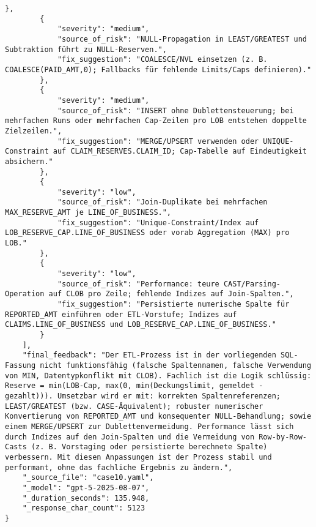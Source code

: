 \begin{lstlisting}[caption={Ausgabe: GPT-5 Anwendungsfall 10 Robustheitsdurchlauf},label={gpt_case10_prompt3}]
        },
        {
            "severity": "medium",
            "source_of_risk": "NULL-Propagation in LEAST/GREATEST und Subtraktion führt zu NULL-Reserven.",
            "fix_suggestion": "COALESCE/NVL einsetzen (z. B. COALESCE(PAID_AMT,0); Fallbacks für fehlende Limits/Caps definieren)."
        },
        {
            "severity": "medium",
            "source_of_risk": "INSERT ohne Dublettensteuerung; bei mehrfachen Runs oder mehrfachen Cap-Zeilen pro LOB entstehen doppelte Zielzeilen.",
            "fix_suggestion": "MERGE/UPSERT verwenden oder UNIQUE-Constraint auf CLAIM_RESERVES.CLAIM_ID; Cap-Tabelle auf Eindeutigkeit absichern."
        },
        {
            "severity": "low",
            "source_of_risk": "Join-Duplikate bei mehrfachen MAX_RESERVE_AMT je LINE_OF_BUSINESS.",
            "fix_suggestion": "Unique-Constraint/Index auf LOB_RESERVE_CAP.LINE_OF_BUSINESS oder vorab Aggregation (MAX) pro LOB."
        },
        {
            "severity": "low",
            "source_of_risk": "Performance: teure CAST/Parsing-Operation auf CLOB pro Zeile; fehlende Indizes auf Join-Spalten.",
            "fix_suggestion": "Persistierte numerische Spalte für REPORTED_AMT einführen oder ETL-Vorstufe; Indizes auf CLAIMS.LINE_OF_BUSINESS und LOB_RESERVE_CAP.LINE_OF_BUSINESS."
        }
    ],
    "final_feedback": "Der ETL-Prozess ist in der vorliegenden SQL-Fassung nicht funktionsfähig (falsche Spaltennamen, falsche Verwendung von MIN, Datentypkonflikt mit CLOB). Fachlich ist die Logik schlüssig: Reserve = min(LOB-Cap, max(0, min(Deckungslimit, gemeldet - gezahlt))). Umsetzbar wird er mit: korrekten Spaltenreferenzen; LEAST/GREATEST (bzw. CASE-Äquivalent); robuster numerischer Konvertierung von REPORTED_AMT und konsequenter NULL-Behandlung; sowie einem MERGE/UPSERT zur Dublettenvermeidung. Performance lässt sich durch Indizes auf den Join-Spalten und die Vermeidung von Row-by-Row-Casts (z. B. Vorstaging oder persistierte berechnete Spalte) verbessern. Mit diesen Anpassungen ist der Prozess stabil und performant, ohne das fachliche Ergebnis zu ändern.",
    "_source_file": "case10.yaml",
    "_model": "gpt-5-2025-08-07",
    "_duration_seconds": 135.948,
    "_response_char_count": 5123
}
\end{lstlisting}

